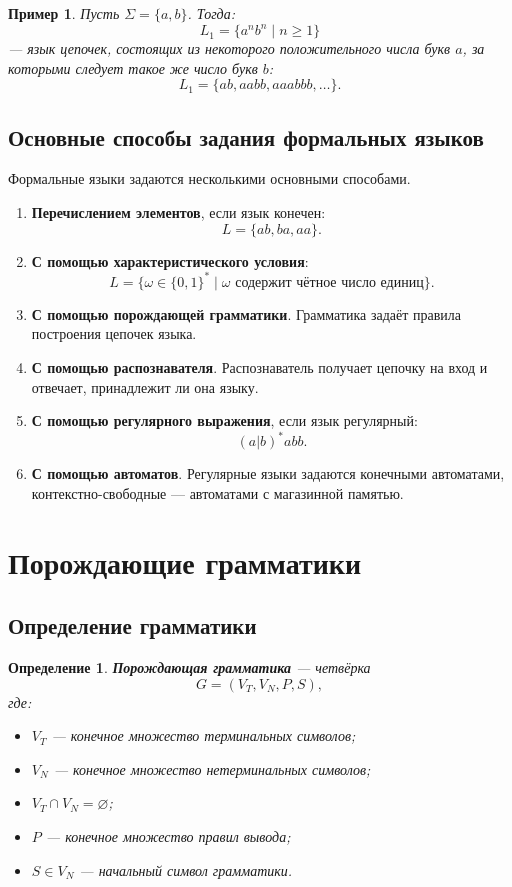 \documentclass[12pt,a4paper]{article}
\newtheorem{definition}{Определение}
\newtheorem{example}{Пример}
\begin{document}
\begin{example}
Пусть $\Sigma=\{a,b\}$. Тогда:
\[
L_1=\{a^n b^n\mid n\ge 1\}
\]
--- язык цепочек, состоящих из некоторого положительного числа букв $a$, за которыми следует такое же число букв $b$:
\[
L_1=\{ab,aabb,aaabbb,\ldots\}.
\]
\end{example}

\subsection{Основные способы задания формальных языков}

Формальные языки задаются несколькими основными способами.

\begin{enumerate}
    \item \textbf{Перечислением элементов}, если язык конечен:
    \[
    L=\{ab,ba,aa\}.
    \]

    \item \textbf{С помощью характеристического условия}:
    \[
    L=\{\omega\in\{0,1\}^* \mid \omega \text{ содержит чётное число единиц}\}.
    \]

    \item \textbf{С помощью порождающей грамматики}.
    Грамматика задаёт правила построения цепочек языка.

    \item \textbf{С помощью распознавателя}.
    Распознаватель получает цепочку на вход и отвечает, принадлежит ли она языку.

    \item \textbf{С помощью регулярного выражения}, если язык регулярный:
    \[
    (a|b)^*abb.
    \]

    \item \textbf{С помощью автоматов}.
    Регулярные языки задаются конечными автоматами, контекстно-свободные --- автоматами с магазинной памятью.
\end{enumerate}

\section{Порождающие грамматики}

\subsection{Определение грамматики}

\begin{definition}
\textbf{Порождающая грамматика} --- четвёрка
\[
G=(V_T,V_N,P,S),
\]
где:
\begin{itemize}
    \item $V_T$ --- конечное множество терминальных символов;
    \item $V_N$ --- конечное множество нетерминальных символов;
    \item $V_T\cap V_N=\varnothing$;
    \item $P$ --- конечное множество правил вывода;
    \item $S\in V_N$ --- начальный символ грамматики.
\end{itemize}
\end{definition}
\end{document}
